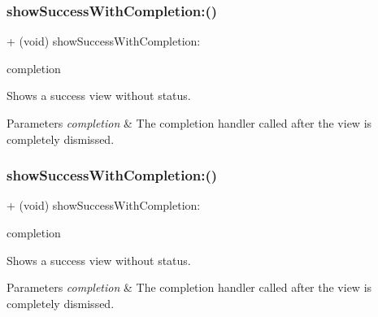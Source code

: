 \subsubsection{\texorpdfstring{show\+Success\+With\+Completion\+:()}{showSuccessWithCompletion:()}\hspace{0.1cm}{\footnotesize\ttfamily [2/3]}}
{\footnotesize\ttfamily + (void) show\+Success\+With\+Completion\+: \begin{DoxyParamCaption}\item[{(K\+V\+N\+Completion\+Block)}]{completion }\end{DoxyParamCaption}}

Shows a success view without status. 
\begin{DoxyParams}{Parameters}
{\em completion} & The completion handler called after the view is completely dismissed. \\
\hline
\end{DoxyParams}
\mbox{\label{interface_k_v_n_progress_aa5757d5457364be1b1a03224c934ff32}} 
\subsubsection{\texorpdfstring{show\+Success\+With\+Completion\+:()}{showSuccessWithCompletion:()}\hspace{0.1cm}{\footnotesize\ttfamily [3/3]}}
{\footnotesize\ttfamily + (void) show\+Success\+With\+Completion\+: \begin{DoxyParamCaption}\item[{(K\+V\+N\+Completion\+Block)}]{completion }\end{DoxyParamCaption}}

Shows a success view without status. 
\begin{DoxyParams}{Parameters}
{\em completion} & The completion handler called after the view is completely dismissed. \\
\hline
\end{DoxyParams}
\mbox{\label{interface_k_v_n_progress_ae9b8b57302f6a4456658e758784790bf}} 
